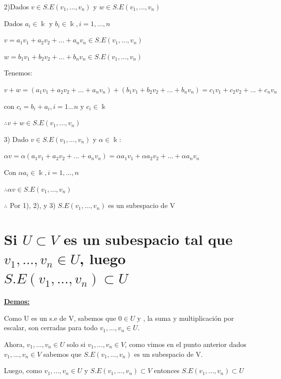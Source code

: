 \documentclass[12 pt]{article}
\begin{document}
2)Dados $ v \in S.E({v}_{1},...,{v}_{n})$ y
$w \in S.E({v}_{1},...,{v}_{n})$


Dados ${a}_{i} \in \Bbbk $ y ${b}_{i} \in \Bbbk , i=1,...,n$

\begin{center}
	
$v={a}_{1}{v}_{1}+{a}_{2}{v}_{2}+...+{a}_{n}{v}_{n} \in  S.E({v}_{1},...,{v}_{n})$

$w={b}_{1}{v}_{1}+{b}_{2}{v}_{2}+...+{b}_{n}{v}_{n} \in  S.E({v}_{1},...,{v}_{n})$
 


\end{center}



Tenemos:

\begin{center}
	$v+w=({a}_{1}{v}_{1}+{a}_{2}{v}_{2}+...+{a}_{n}{v}_{n})+({b}_{1}{v}_{1}+{b}_{2}{v}_{2}+...+{b}_{n}{v}_{n})=
	{c}_{1}{v}_{1}+{c}_{2}{v}_{2}+...+{c}_{n}{v}_{n} $

	
	con ${c}_{i}={b}_{i}+{a}_{i}, i=1...n$ y ${c}_{i} \in \Bbbk$
\end{center}
 
 $ \therefore v+w \in S.E({v}_{1},...,{v}_{n})$
 
 \newpage
 
 3) Dado $v \in S.E({v}_{1},...,{v}_{n})$ y $\alpha \in \Bbbk $:
 
 \begin{center}
 	
 	$ \alpha v= \alpha ({a}_{1}{v}_{1}+{a}_{2}{v}_{2}+...+{a}_{n}{v}_{n})=
 	{\alpha a}_{1}{v}_{1}+{\alpha a}_{2}{v}_{2}+...+{\alpha a}_{n}{v}_{n}$
 	
 	Con $ {\alpha a}_{i} \in \Bbbk , i=1,...,n$
\end{center}

$ \therefore \alpha v \in S.E({v}_{1},...,{v}_{n})$


\begin{center} 
	
	$ \therefore $ Por 1), 2), y 3) $ S.E({v}_{1},...,{v}_{n}) $ es un subespacio de V 
\end{center}



  \section{Si $U \subset V$ es un subespacio tal que ${v}_{1},...,{v}_{n} \in U$, luego $S.E({v}_{1},...,{v}_{n}) \subset U$ }

\underline{\textbf{Demos:}}

Como U es un s.e de V, sabemos que $0 \in U$ y , la suma y  multiplicación por escalar, son cerradas para todo ${v}_{1},...,{v}_{n} \in U. $

Ahora, ${v}_{1},...,{v}_{n} \in U$  solo si ${v}_{1},...,{v}_{n} \in V$, como vimos en el punto anterior dados ${v}_{1},...,{v}_{n} \in V$ sabemos que  $ S.E({v}_{1},...,{v}_{n}) $ es un subespacio de V. 

Luego, como ${v}_{1},...,{v}_{n} \in U $ y $ S.E({v}_{1},...,{v}_{n}) \subset V $ entonces   $ S.E({v}_{1},...,{v}_{n}) \subset U $
\end{document}
